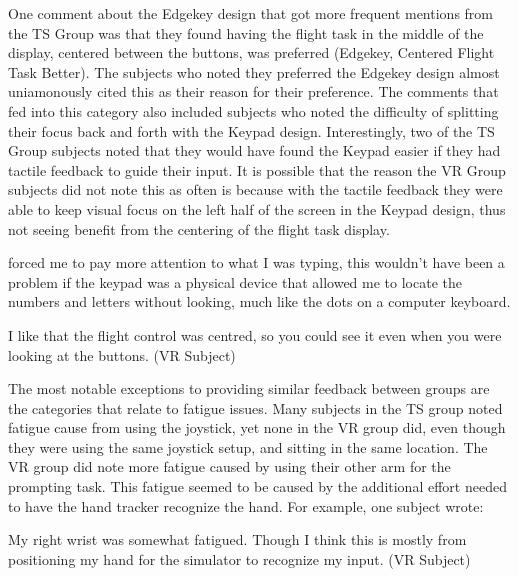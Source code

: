 One comment about the Edgekey design that got more frequent mentions from the TS Group was that they found having the flight task in the middle of the display, centered between the buttons, was preferred (Edgekey, Centered Flight Task Better).
The subjects who noted they preferred the Edgekey design almost uniamonously cited this as their reason for their preference.
The comments that fed into this category also included subjects who noted the difficulty of splitting their focus back and forth with the Keypad design.
Interestingly, two of the TS Group subjects noted that they would have found the Keypad easier if they had tactile feedback to guide their input.
It is possible that the reason the VR Group subjects did not note this as often is because with the tactile feedback they were able to keep visual focus on the left half of the screen in the Keypad design, thus not seeing benefit from the centering of the flight task display.
\begin{displayquote}[TS Subject]
     forced me to pay more attention to what I was typing, this wouldn't have been a problem if the keypad was a physical device that allowed me to locate the numbers and letters without looking, much like the dots on a computer keyboard.
\end{displayquote}
\begin{displayquote}[VR Subject]
    I like that the flight control was centred, so you could see it even when you were looking at the buttons.
    (VR Subject)
\end{displayquote}

The most notable exceptions to providing similar feedback between groups are the categories that relate to fatigue issues.
Many subjects in the TS group noted fatigue cause from using the joystick, yet none in the VR group did, even though they were using the same joystick setup, and sitting in the same location.
The VR group did note more fatigue caused by using their other arm for the prompting task.
This fatigue seemed to be caused by the additional effort needed to have the hand tracker recognize the hand.
For example, one subject wrote:
\begin{displayquote}[VR Subject]
    My right wrist was somewhat fatigued.  Though I think this is mostly from positioning my hand for the simulator to recognize my input.
    (VR Subject)
\end{displayquote}


